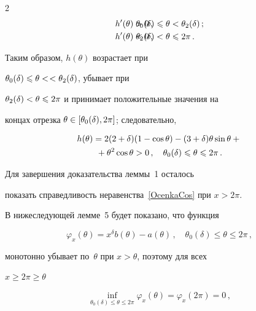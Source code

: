 \begin{multicols}{2}
\begin{align*}

  h^\prime(\theta)&>0\,, & \hspace*{-30pt} \theta_0(\d)&\le\theta<\theta_2(\d)\,; \\

  h^\prime(\theta)&<0\,, & \hspace*{-30pt} \theta_2(\d)&<\theta\le2\pi\,.

\end{align*}

Таким образом, $h(\theta)$ возрастает при

$\theta_0(\delta)\leqslant\theta<$\linebreak $<\theta_2(\delta)$, убывает при

${\theta_2(\delta)<\theta\leqslant2\pi}$ и принимает положительные значения на

концах отрезка ${\theta\in[\theta_0(\delta),2\pi]}$; следовательно,

\begin{multline}

\label{OcenkaCos_h(theta)>0}

h(\theta)=2(2+\d)(1-\cos\theta)-

(3+\d)\theta\sin\theta+{}\\

{}+

\theta^2\cos\theta>0\,,\quad

\theta_0(\d)\le\theta\le 2\pi\,.

\end{multline}



Для завершения доказательства леммы~1 осталось

показать справедливость неравенства~\eqref{OcenkaCos} при $x>2\pi$.

В нижеследующей лемме~5 будет показано, что функция

$$

\varphi_x(\theta)=x^{\delta}b(\theta)-a(\theta)\,,\quad

\theta_0(\delta)\le\theta\le2\pi\,,

$$

монотонно убывает по~$\theta$ при $x>\theta$, поэтому для всех

$x\ge2\pi\ge\theta$

$$

\inf_{\theta_0(\delta)\le\theta\le2\pi}\varphi_x(\theta) =

\varphi_x(2\pi)=0\,,

$$


\end{multicols}

